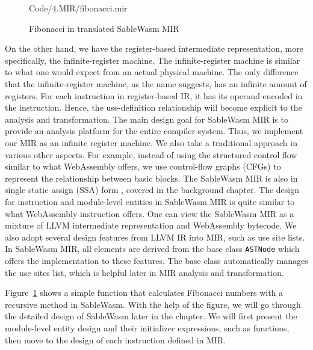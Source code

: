 \begin{figure}
    \centering
    
    {Code/4.MIR/fibonacci.mir}
    \caption{Fibonacci in translated SableWasm MIR}
    \label{fig:mir-fibonacci}
\end{figure}

On the other hand, we have the register-based intermediate representation, more specifically, the infinite-register machine. The infinite-register machine is similar to what one would expect from an actual physical machine. The only difference that the infinite-register machine, as the name suggests, has an infinite amount of registers. For each instruction in register-based IR, it has its operand encoded in the instruction. Hence, the use-definition relationship will become explicit to the analysis and transformation. The main design goal for SableWasm MIR is to provide an analysis platform for the entire compiler system. Thus, we implement our MIR as an infinite register machine. We also take a traditional approach in various other aspects. For example, instead of using the structured control flow similar to what WebAssembly offers, we use control-flow graphs (CFGs) to represent the relationship between basic blocks. The SableWasm MIR is also in single static assign (SSA) form \cite{ibm-ssa}, covered in the background chapter. The design for instruction and module-level entities in SableWasm MIR is quite similar to what WebAssembly instruction offers. One can view the SableWasm MIR as a mixture of LLVM intermediate representation and WebAssembly bytecode. We also adopt several design features from LLVM IR into MIR, such as use site lists. In SableWasm MIR, all elements are derived from the base class \texttt{ASTNode} which offers the implementation to these features. The base class automatically manages the use sites list, which is helpful later in MIR analysis and transformation.

Figure~\ref{fig:mir-fibonacci} shows a simple function that calculates Fibonacci numbers with a recursive method in SableWasm. With the help of the figure, we will go through the detailed design of SableWasm later in the chapter. We will first present the module-level entity design and their initializer expressions, such as functions, then move to the design of each instruction defined in MIR.





